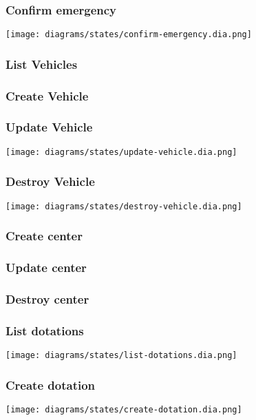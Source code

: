 \subsubsection{Confirm emergency}
\texttt{[image: diagrams/states/confirm-emergency.dia.png]}

\subsubsection{List Vehicles}

\subsubsection{Create Vehicle}

\subsubsection{Update Vehicle}
\texttt{[image: diagrams/states/update-vehicle.dia.png]}

\subsubsection{Destroy Vehicle}
\texttt{[image: diagrams/states/destroy-vehicle.dia.png]}

\subsubsection{Create center}

\subsubsection{Update center}

\subsubsection{Destroy center}

\subsubsection{List dotations}
\texttt{[image: diagrams/states/list-dotations.dia.png]}

\subsubsection{Create dotation}
\texttt{[image: diagrams/states/create-dotation.dia.png]}

